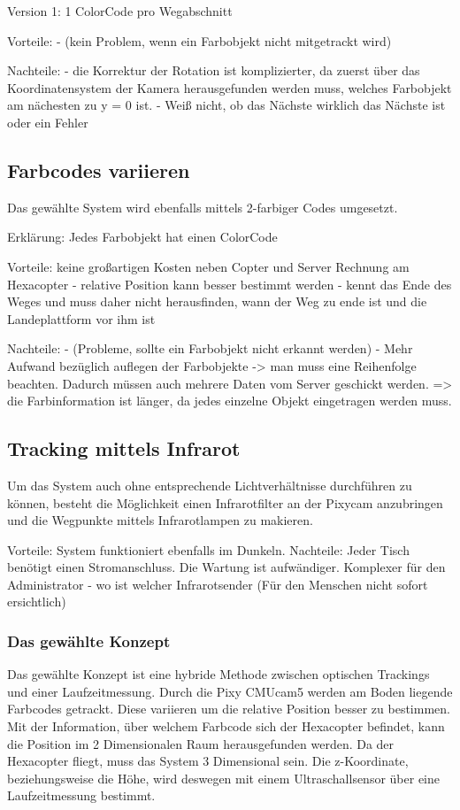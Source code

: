   Version 1: 1 ColorCode pro Wegabschnitt

  Vorteile:
  - (kein Problem, wenn ein Farbobjekt nicht mitgetrackt wird)

  Nachteile:
  - die Korrektur der Rotation ist komplizierter, da zuerst über das Koordinatensystem der Kamera herausgefunden werden muss, welches Farbobjekt am nächesten zu y = 0 ist. 
  - Weiß nicht, ob das Nächste wirklich das Nächste ist oder ein Fehler

  \subsection*{Farbcodes variieren}
  Das gewählte System wird ebenfalls mittels 2-farbiger Codes umgesetzt.

  Erklärung: Jedes Farbobjekt hat einen ColorCode

  Vorteile:
  keine großartigen Kosten neben Copter und Server
  Rechnung am Hexacopter
  - relative Position kann besser bestimmt werden
  - kennt das Ende des Weges und muss daher nicht herausfinden, wann der Weg zu ende ist und die Landeplattform vor ihm ist

  Nachteile:
  - (Probleme, sollte ein Farbobjekt nicht erkannt werden)
  - Mehr Aufwand bezüglich auflegen der Farbobjekte -> man muss eine Reihenfolge beachten. Dadurch müssen auch mehrere Daten vom Server geschickt werden. => die Farbinformation ist länger, da jedes einzelne Objekt eingetragen werden muss. 



  \subsection*{Tracking mittels Infrarot}
  Um das System auch ohne entsprechende Lichtverhältnisse durchführen zu können, besteht die Möglichkeit einen Infrarotfilter an der Pixycam anzubringen und die Wegpunkte mittels Infrarotlampen zu makieren. 

  Vorteile:
  System funktioniert ebenfalls im Dunkeln.
  Nachteile: 
  Jeder Tisch benötigt einen Stromanschluss.
  Die Wartung ist aufwändiger.
  Komplexer für den Administrator - wo ist welcher Infrarotsender (Für den Menschen nicht sofort ersichtlich)


  \subsubsection{Das gewählte Konzept}
  Das gewählte Konzept ist eine hybride Methode zwischen optischen Trackings und einer Laufzeitmessung. 
  Durch die Pixy CMUcam5 werden am Boden liegende Farbcodes getrackt. Diese variieren um die relative Position besser zu bestimmen. Mit der Information, über welchem Farbcode sich der Hexacopter befindet, kann die Position im 2 Dimensionalen Raum herausgefunden werden. Da der Hexacopter fliegt, muss das System 3 Dimensional sein. Die z-Koordinate, beziehungsweise die Höhe, wird deswegen mit einem Ultraschallsensor über eine Laufzeitmessung bestimmt.

